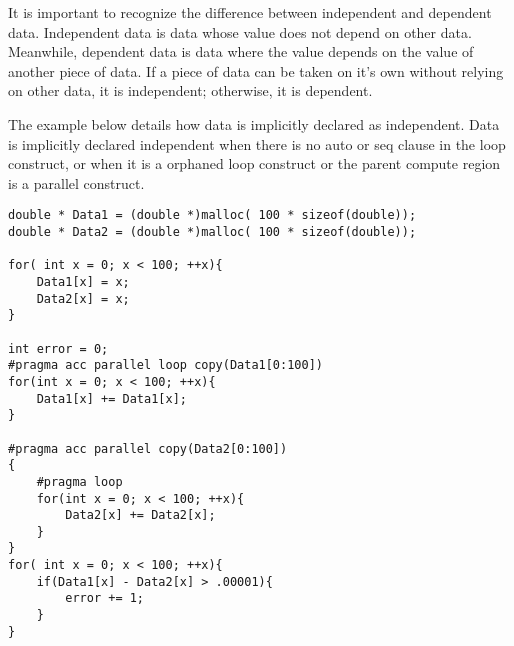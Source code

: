 It is important to recognize the difference between independent and dependent data. Independent data is data whose value does not depend on other data. Meanwhile, dependent data is data where the value depends on the value of another piece of data. If a piece of data can be taken on it's own without relying on other data, it is independent; otherwise, it is dependent. 

The example below details how data is implicitly declared as independent. Data is implicitly declared independent when there is no auto or seq clause in the loop construct, or when it is a orphaned loop construct or the parent compute region is a parallel construct. 

\begin{Code}
\begin{lstlisting}[frame=single, caption=dataIndependence.c, label=prototype, numbers=none]
double * Data1 = (double *)malloc( 100 * sizeof(double));
double * Data2 = (double *)malloc( 100 * sizeof(double));

for( int x = 0; x < 100; ++x){
    Data1[x] = x;
    Data2[x] = x;
}

int error = 0;
#pragma acc parallel loop copy(Data1[0:100])
for(int x = 0; x < 100; ++x){
    Data1[x] += Data1[x];
}

#pragma acc parallel copy(Data2[0:100])
{
    #pragma loop
    for(int x = 0; x < 100; ++x){
        Data2[x] += Data2[x];
    }
}
for( int x = 0; x < 100; ++x){
    if(Data1[x] - Data2[x] > .00001){
        error += 1;
    }
}
\end{lstlisting}
\end{Code}